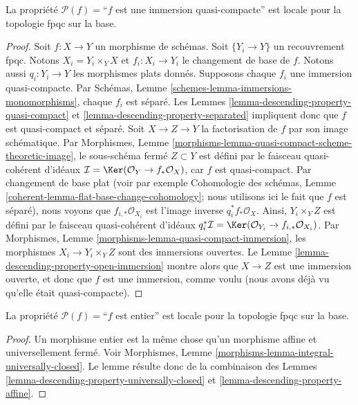 \begin{lemma}
\label{lemma-descending-property-quasi-compact-immersion}
La propriété $\mathcal{P}(f) =$``$f$ est une immersion quasi-compacte''
est locale pour la topologie fpqc sur la base.
\end{lemma}

\begin{proof}
Soit $f : X \to Y$ un morphisme de schémas.
Soit $\{Y_i \to Y\}$ un recouvrement fpqc.
Notons $X_i = Y_i \times_Y X$ et $f_i : X_i \to Y_i$
le changement de base de $f$. Notons aussi
$q_i : Y_i \to Y$ les morphismes plats donnés.
Supposons chaque $f_i$ une immersion quasi-compacte.
Par Schémas, Lemme \ref{schemes-lemma-immersions-monomorphisms},
chaque $f_i$ est séparé.
Les Lemmes \ref{lemma-descending-property-quasi-compact} et
\ref{lemma-descending-property-separated}
impliquent donc que $f$ est quasi-compact et séparé.
Soit $X \to Z \to Y$ la factorisation de $f$ par son
image schématique. Par
Morphismes, Lemme \ref{morphisms-lemma-quasi-compact-scheme-theoretic-image},
le sous-schéma fermé $Z \subset Y$ est défini par le
faisceau quasi-cohérent d'idéaux
$\mathcal{I} = \Ker(\mathcal{O}_Y \to f_*\mathcal{O}_X)$,
car $f$ est quasi-compact. Par changement de base plat
(voir par exemple Cohomologie des schémas,
Lemme \ref{coherent-lemma-flat-base-change-cohomology};
nous utilisons ici le fait que $f$ est séparé),
nous voyons que $f_{i, *}\mathcal{O}_{X_i}$ est l'image inverse
$q_i^*f_*\mathcal{O}_X$.
Ainsi, $Y_i \times_Y Z$ est défini par le
faisceau quasi-cohérent d'idéaux $q_i^*\mathcal{I} =
\Ker(\mathcal{O}_{Y_i} \to f_{i, *}\mathcal{O}_{X_i})$.
Par Morphismes, Lemme \ref{morphisms-lemma-quasi-compact-immersion},
les morphismes $X_i \to Y_i \times_Y Z$
sont des immersions ouvertes. Le
Lemme \ref{lemma-descending-property-open-immersion}
montre alors que $X \to Z$ est une immersion ouverte, et donc que
$f$ est une immersion, comme voulu
(nous avons déjà vu qu'elle était quasi-compacte).
\end{proof}

\begin{lemma}
\label{lemma-descending-property-integral}
La propriété $\mathcal{P}(f) =$``$f$ est entier''
est locale pour la topologie fpqc sur la base.
\end{lemma}

\begin{proof}
Un morphisme entier est la même chose qu'un morphisme affine et
universellement fermé. Voir
Morphismes, Lemme \ref{morphisms-lemma-integral-universally-closed}.
Le lemme résulte donc de la combinaison des
Lemmes \ref{lemma-descending-property-universally-closed}
et \ref{lemma-descending-property-affine}.
\end{proof}

